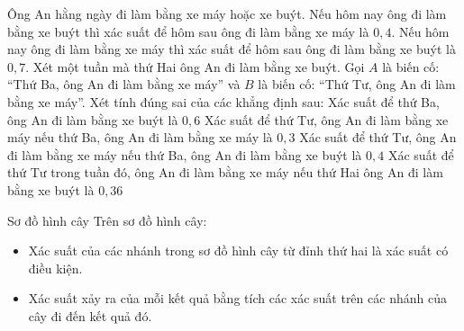 \begin{ex}
	Ông An hằng ngày đi làm bằng xe máy hoặc xe buýt. Nếu hôm nay ông đi làm bằng xe buýt thì xác suất để hôm sau ông đi làm bằng xe máy là $0,4$. Nếu hôm nay ông đi làm bằng xe máy thì xác suất để hôm sau ông đi làm bằng xe buýt là $0,7$. Xét một tuần mà thứ Hai ông An đi làm bằng xe buýt. Gọi $A$ là biến cố: ``Thứ Ba, ông An đi làm bằng xe máy'' và $B$ là biến cố: ``Thứ Tư, ông An đi làm bằng xe máy''. Xét tính đúng sai của các khẳng định sau:
	\choiceTF
	{\True Xác suất để thứ Ba, ông An đi làm bằng xe buýt là $0,6$}
	{\True Xác suất để thứ Tư, ông An đi làm bằng xe máy nếu thứ Ba, ông An đi làm bằng xe máy là $0,3$}
	{\True Xác suất để thứ Tư, ông An đi làm bằng xe máy nếu thứ Ba, ông An đi làm bằng xe buýt là $0,4$}
	{\True Xác suất để thứ Tư trong tuần đó, ông An đi làm bằng xe máy nếu thứ Hai ông An đi làm bằng xe buýt là $0,36$}
\end{ex}


\begin{dang}{Sơ đồ hình cây}
	Trên sơ đồ hình cây:
	\begin{itemize}
		\item Xác suất của các nhánh trong sơ đồ hình cây từ đỉnh thứ hai là xác suất có điều kiện.
		\item Xác suất xảy ra của mỗi kết quả bằng tích các xác suất trên các nhánh của cây đi đến kết quả đó.
	\end{itemize}
\end{dang}
\setcounter{vd}{0}

